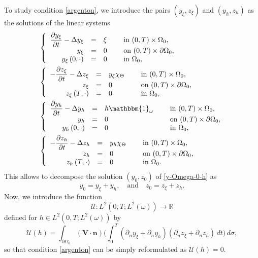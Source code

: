 \documentclass[JEP,XML,SOM,Unicode,NoFloatCountersInSection]{cedram}
\newcommand{\bn}{\boldsymbol{n}}
\newcommand{\bV}{\boldsymbol{V}}
\newcommand\R{{\mathbb R}}
\theoremstyle{definition}
\begin{document}
To study condition \eqref{argenton}, we introduce the pairs $(y_\xi,z_\xi)$ and $(y_h,z_h)$ as the solutions of the linear systems
\begin{align}
&\left\{
\begin{array}{rcll}
\dfrac{\partial y_\xi}{\partial t}-\Delta y_\xi &=&\xi \quad&\text{ in } (0,T) \times \Omega_0,
\\
y_\xi &=& 0 &\text{ on }(0,T) \times \partial \Omega_0,
\\
y_\xi\left(0,\cdot \right) &=& 0 &\text{ in }\Omega_{0},
\end{array}
\right.
\label{cou1b}
\\
&\left\{
\begin{array}{rcll}
-\dfrac{\partial z_\xi}{\partial t}-\Delta z_\xi &=& y_\xi\chi_{\Theta}\quad&\text{ in } (0,T) \times \Omega_0,
\\
z_\xi&=& 0 &\text{ on }(0,T) \times \partial \Omega_0,
\\
z_\xi\left(T,\cdot\right) &=& 0 &\text{ in }\Omega_{0},
\end{array}
\right.
\label{cou2b}
\\
&\left\{
\begin{array}{rcll}
\dfrac{\partial y_h}{\partial t}-\Delta y_h &=& h\mathbbm{1}_{\omega} \quad&\text{ in } (0,T) \times \Omega_0,
\\
y_h &=& 0 &\text{ on }(0,T) \times \partial \Omega_0,
\\
y_h \left(0,\cdot \right) &=& 0 &\text{ in }\Omega_{0},
\end{array}
\right.
\label{cou1bis}
\\
&\left\{
\begin{array}{rcll}
-\dfrac{\partial z_h}{\partial t}-\Delta z_h &=& {y_h}\chi_{\Theta}\quad&\text{ in }(0,T) \times \Omega_0,
\\
z_h &=& 0 &\text{ on }(0,T) \times \partial \Omega_0,
\\
z_h\left(T,\cdot\right) &=& 0 &\text{ in }\Omega_{0}.
\end{array}
\right.
\label{cou2bis}
\end{align}
This allows to decompose the solution $(y_0,z_0)$ of \eqref{y-Omega-0-h} as
\[
y_{0}=y_\xi+y_h, \quad\text{and} \quad z_{0}=z_\xi+z_h.
\]
Now, we introduce the function
\[
\mathcal{U}: L^2(0,T; L^2(\omega)) \to \R
\]
defined for $h \in L^2(0,T; L^2(\omega))$ by
\begin{equation*}
\mathcal{U}(h) =
\int_{\partial\Omega_{0}}(\bV\cdot \bn)
\biggl(\int_{0}^{T}(\partial_{n}y_{\xi} + \partial_n y_h) (\partial_{n} z_{\xi} + \partial_n z_h)\, dt \biggr)\,
d\sigma,
\end{equation*}
so that condition \eqref{argenton} can be simply reformulated as $\mathcal{U}(h) = 0$.
\end{document}
